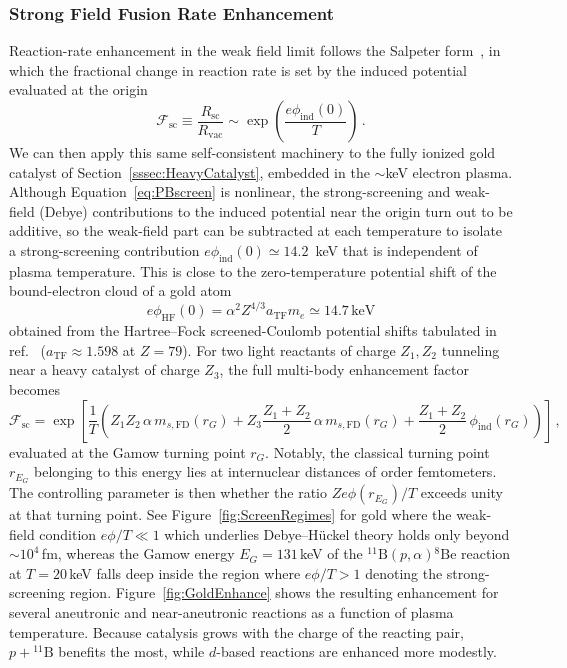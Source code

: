 \documentclass[particles,article,accept,pdftex,moreauthors]{Definitions/mdpi}
\begin{document}
\subsubsection{Strong Field Fusion Rate Enhancement}\label{sssec:FusionEnhancement}
Reaction-rate enhancement in the weak field limit follows the Salpeter form~\cite{Salpeter:1954nc}, in which the fractional change in reaction rate is set by the induced potential evaluated at the origin
\begin{equation}\label{eq:salpeter}
\mathcal{F}_\mathrm{sc} \equiv \frac{R_\mathrm{sc}}{R_\mathrm{vac}} \sim \exp\!\left(\frac{e\phi_\mathrm{ind}(0)}{T}\right)\,.
\end{equation}
We can then apply this same self-consistent machinery to the fully ionized gold catalyst of Section~\ref{sssec:HeavyCatalyst}, embedded in the $\sim$keV electron plasma. Although Equation~\eqref{eq:PBscreen} is nonlinear, the strong-screening and weak-field (Debye) contributions to the induced potential near the origin turn out to be additive, so the weak-field part can be subtracted at each temperature to isolate a strong-screening contribution $e\phi_\mathrm{ind}(0)\simeq14.2$~keV that is independent of plasma temperature. This is close to the zero-temperature potential shift of the bound-electron cloud of a gold atom
\begin{equation}
 e\phi_\mathrm{HF}(0)=\alpha^2Z^{4/3}a_\mathrm{TF}m_e\simeq14.7\,\mathrm{keV}
\end{equation}
obtained from the Hartree--Fock screened-Coulomb potential shifts tabulated in ref.~\cite{garrett1967potential} ($a_\mathrm{TF}\approx1.598$ at $Z=79$). For two light reactants of charge $Z_1,Z_2$ tunneling near a heavy catalyst of charge $Z_3$, the full multi-body enhancement factor becomes
\begin{equation}\label{eq:goldF}
\mathcal{F}_\mathrm{sc} = \exp\!\left[\frac{1}{T}\left(Z_1Z_2\,\alpha\, m_{s,\mathrm{FD}}(r_G) + Z_3\frac{Z_1+Z_2}{2}\,\alpha\, m_{s,\mathrm{FD}}(r_G) + \frac{Z_1+Z_2}{2}\,\phi_\mathrm{ind}(r_G)\right)\right]\,,
\end{equation}
evaluated at the Gamow turning point $r_G$. Notably, the classical turning point $r_{E_G}$ belonging to this energy lies at internuclear distances of order femtometers. The controlling parameter is then whether the ratio $Ze\phi(r_{E_G})/T$ exceeds unity at that turning point. See Figure~\ref{fig:ScreenRegimes} for gold where the weak-field condition $e\phi/T\ll1$ which underlies Debye--H\"uckel theory holds only beyond ${\sim}10^4$\,fm, whereas the Gamow energy $E_G=131$\,keV of the ${}^{11}\mathrm{B}(p,\alpha){}^{8}\mathrm{Be}$ reaction at $T=20$\,keV falls deep inside the region where $e\phi/T>1$ denoting the strong-screening region. Figure~\ref{fig:GoldEnhance} shows the resulting enhancement for several aneutronic and near-aneutronic reactions as a function of plasma temperature. Because catalysis grows with the charge of the reacting pair, $p+{}^{11}\mathrm{B}$ benefits the most, while $d$-based reactions are enhanced more modestly.
\end{document}
